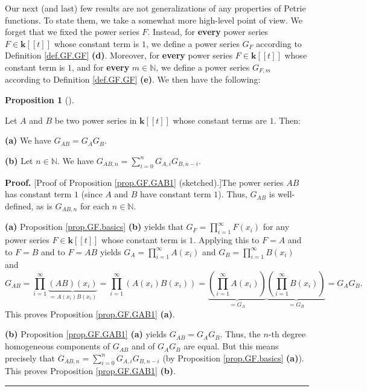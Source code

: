\documentclass[numbers=enddot,12pt,final,onecolumn,notitlepage]{scrartcl}%
\theoremstyle{definition}
\newtheorem{prop}[theo]{Proposition}
\newenvironment{proposition}[1][]
{\begin{prop}[#1]\begin{leftbar}}
{\end{leftbar}\end{prop}}
\newenvironment{proof}[1][Proof]{\noindent\textbf{#1.} }{\ \rule{0.5em}{0.5em}}
\let\sumnonlimits\sum
\let\prodnonlimits\prod
\renewcommand{\sum}{\sumnonlimits\limits}
\renewcommand{\prod}{\prodnonlimits\limits}
\newenvironment{vershort}{}{}
\begin{document}
Our next (and last) few results are not generalizations of any properties of
Petrie functions. To state them, we take a somewhat more high-level point of
view. We forget that we fixed the power series $F$. Instead, for
\textbf{every} power series $F\in\mathbf{k}\left[  \left[  t\right]  \right]
$ whose constant term is $1$, we define a power series $G_{F}$ according to
Definition \ref{def.GF.GF} \textbf{(d)}. Moreover, for \textbf{every} power
series $F\in\mathbf{k}\left[  \left[  t\right]  \right]  $ whose constant term
is $1$, and for \textbf{every} $m\in\mathbb{N}$, we define a power series
$G_{F,m}$ according to Definition \ref{def.GF.GF} \textbf{(e)}. We then have
the following:

\begin{proposition}
\label{prop.GF.GAB1}Let $A$ and $B$ be two power series in $\mathbf{k}\left[
\left[  t\right]  \right]  $ whose constant terms are $1$. Then:

\textbf{(a)} We have $G_{AB}=G_{A}G_{B}$.

\textbf{(b)} Let $n\in\mathbb{N}$. We have $G_{AB,n}=\sum_{i=0}^{n}%
G_{A,i}G_{B,n-i}$.
\end{proposition}

\begin{vershort}
\begin{proof}
[Proof of Proposition \ref{prop.GF.GAB1} (sketched).]The power series $AB$ has
constant term $1$ (since $A$ and $B$ have constant term $1$). Thus, $G_{AB}$
is well-defined, as is $G_{AB,n}$ for each $n\in\mathbb{N}$.

\textbf{(a)} Proposition \ref{prop.GF.basics} \textbf{(b)} yields that
$G_{F}=\prod_{i=1}^{\infty}F\left(  x_{i}\right)  $ for any power series
$F\in\mathbf{k}\left[  \left[  t\right]  \right]  $ whose constant term is
$1$. Applying this to $F=A$ and to $F=B$ and to $F=AB$ yields $G_{A}%
=\prod_{i=1}^{\infty}A\left(  x_{i}\right)  $ and $G_{B}=\prod_{i=1}^{\infty
}B\left(  x_{i}\right)  $ and
\[
G_{AB}=\prod_{i=1}^{\infty}\underbrace{\left(  AB\right)  \left(
x_{i}\right)  }_{=A\left(  x_{i}\right)  B\left(  x_{i}\right)  }=\prod
_{i=1}^{\infty}\left(  A\left(  x_{i}\right)  B\left(  x_{i}\right)  \right)
=\underbrace{\left(  \prod_{i=1}^{\infty}A\left(  x_{i}\right)  \right)
}_{=G_{A}}\underbrace{\left(  \prod_{i=1}^{\infty}B\left(  x_{i}\right)
\right)  }_{=G_{B}}=G_{A}G_{B}.
\]
This proves Proposition \ref{prop.GF.GAB1} \textbf{(a)}.

\textbf{(b)} Proposition \ref{prop.GF.GAB1} \textbf{(a)} yields $G_{AB}%
=G_{A}G_{B}$. Thus, the $n$-th degree homogeneous components of $G_{AB}$ and
of $G_{A}G_{B}$ are equal. But this means precisely that $G_{AB,n}=\sum
_{i=0}^{n}G_{A,i}G_{B,n-i}$ (by Proposition \ref{prop.GF.basics}
\textbf{(a)}). This proves Proposition \ref{prop.GF.GAB1} \textbf{(b)}.
\end{proof}
\end{vershort}
\end{document}
